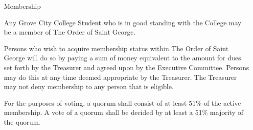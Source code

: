 {
	\begin{article}{Membership}
		\item Any Grove City College Student who is in good standing with the College may be a member of The Order of Saint George.
		\item Persons who wish to acquire membership status within The Order of Saint George will do so by paying a sum of money equivalent to the amount for dues set forth by the Treasurer and agreed upon by the Executive Committee.  Persons may do this at any time deemed appropriate by the Treasurer.  The Treasurer may not deny membership to any person that is eligible.
		\item For the purposes of voting, a quorum shall consist of at least 51\% of the active membership.  A vote of a quorum shall be decided by at least a 51\% majority of the quorum.
	\end{article}
}